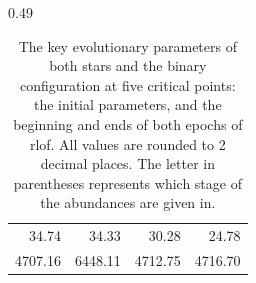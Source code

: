 \begin{table}
\begin{subtable}[b]{0.49\linewidth}
\begin{tabular}{rr|rr}
                                                                                                                                    34.74 &              34.33 &              30.28 &              24.78 \\
                                                                                                                                  4707.16 &            6448.11 &            4712.75 &            4716.70 \\
            \bottomrule
        \end{tabular}
        \caption{NVCA}
        \label{tab:binary_configuration_parameters_standard_accretion}
    \end{subtable}
    \caption[The key evolutionary parameters of both stars and the binary configuration at five critical points: the initial parameters, and the beginning and ends of both epochs of \acrshort{rlof}.]{The key evolutionary parameters of both stars and the binary configuration at five critical points: the initial parameters, and the beginning and ends of both epochs of \gls{rlof}. All values are rounded to 2 decimal places. The letter in parentheses represents which stage of  the abundances are given in.}
    \label{tab:binary_configuration_parameters}
\end{table}